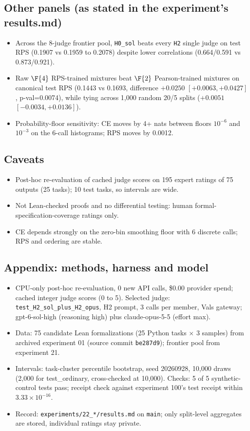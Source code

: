 \subsection*{Other panels (as stated in the experiment's results.md)}
\begin{itemize}
  \item Across the 8-judge frontier pool, \texttt{H0\_sol} beats every \texttt{H2} single judge on test RPS (0.1907 vs 0.1959 to 0.2078) despite lower correlations (0.664/0.591 vs 0.873/0.921).
  \item Raw $\F{4}$ RPS-trained mixtures beat $\F{2}$ Pearson-trained mixtures on canonical test RPS (0.1443 vs 0.1693, difference $+0.0250$ $[+0.0063, +0.0427]$, p-val=0.0074), while tying across 1,000 random 20/5 splits ($+0.0051$ $[-0.0034, +0.0136]$).
  \item Probability-floor sensitivity: CE moves by 4+ nats between floors $10^{-6}$ and $10^{-3}$ on the 6-call histograms; RPS moves by 0.0012.
\end{itemize}

\subsection*{Caveats}
\begin{itemize}
  \item Post-hoc re-evaluation of cached judge scores on 195 expert ratings of 75 outputs (25 tasks); 10 test tasks, so intervals are wide.
  \item Not Lean-checked proofs and no differential testing: human formal-specification-coverage ratings only.
  \item CE depends strongly on the zero-bin smoothing floor with 6 discrete calls; RPS and ordering are stable.
\end{itemize}

\subsection*{Appendix: methods, harness and model}
\begin{itemize}
  \item CPU-only post-hoc re-evaluation, 0 new API calls, \$0.00 provider spend; cached integer judge scores (0 to 5). Selected judge: \texttt{test\_H2\_sol\_plus\_H2\_opus}, H2 prompt, 3 calls per member, Vals gateway; gpt-6-sol-high (reasoning high) plus claude-opus-5-5 (effort max).
  \item Data: 75 candidate Lean formalizations (25 Python tasks $\times$ 3 samples) from archived experiment 01 (source commit \texttt{be287d9}); frontier pool from experiment 21.
  \item Intervals: task-cluster percentile bootstrap, seed 20260928, 10,000 draws (2,000 for test\_ordinary, cross-checked at 10,000). Checks: 5 of 5 synthetic-control tests pass; receipt check against experiment 100's test receipt within $3.33\times10^{-16}$.
  \item Record: \texttt{experiments/22\_*/results.md} on \texttt{main}; only split-level aggregates are stored, individual ratings stay private.
\end{itemize}
